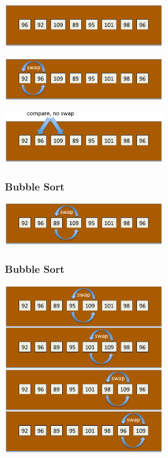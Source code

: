 \documentclass{beamer} %
\begin{document}
\begin{frame}
  \centering
  \includegraphics[width=70mm]{assets/swapping1-cropped.pdf}
\end{frame}
\begin{frame}
  \centering
  \includegraphics[width=70mm]{assets/swapping2-cropped.pdf}
\end{frame}
\begin{frame}
  \centering
  \includegraphics[width=70mm]{assets/swapping3-cropped.pdf}
\end{frame}
\begin{frame}
  \frametitle{Bubble Sort}
  \centering
  \includegraphics[width=70mm]{assets/swapping4-cropped.pdf}
\end{frame}
\begin{frame}
  \frametitle{Bubble Sort}
  \centering
  \includegraphics[width=70mm]{assets/swapping5-cropped.pdf}
\end{frame}
\end{document}
